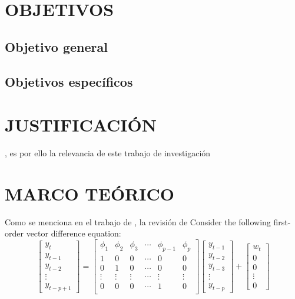 \documentclass[12pt,a4paper]{article} %
\begin{document}
	\section{OBJETIVOS}
		\subsection{Objetivo general}
			\lipsum[8]
		\subsection{Objetivos específicos}
			\lipsum[9]
			\lipsum[10]
			\lipsum[11]
	\newpage
	\section{JUSTIFICACIÓN}
		\lipsum[10]
		\lipsum[11]
		\lipsum[12]
		\lipsum[13]
		\lipsum[14], es por ello la relevancia
		de este trabajo de investigación \citep{Takayama-1985}
	\newpage
	\section{MARCO TEÓRICO}
	Como se menciona en el trabajo de \cite{Johnson-1987}, la revisión de \lipsum[10]
	Consider the following first-order vector difference equation: 
		\begin{equation}\label{eq: MED}
			\left[
				\begin{array}{c}
					y_{t}  \\
					y_{t-1}\\
					y_{t-2}\\
					\vdots \\
					y_{t-p+1}
				\end{array}
			\right] =
			\left[
				\begin{array}{cccccc}
					\phi_{1} & \phi_{2} & \phi_{3} & \cdots & \phi_{p-1} & \phi_{p}\\
					    1    &    0     &    0     & \cdots &      0     &     0   \\
					    0    &    1     &    0     & \cdots &      0     &     0   \\
					 \vdots  &  \vdots  &  \vdots  & \cdots &   \vdots   &  \vdots \\
					    0    &    0     &    0     & \cdots &      1     &     0   \\
				\end{array}
			\right]
			\left[
				\begin{array}{c}
					y_{t-1}\\
					y_{t-2}\\
					y_{t-3}\\
					\vdots \\
					y_{t-p}
				\end{array}
			\right] + 
			\left[
				\begin{array}{c}
					w_{t}\\
					0    \\
					0    \\
				  \vdots \\
				    0
				\end{array}
			\right]
		\end{equation}
\end{document}
